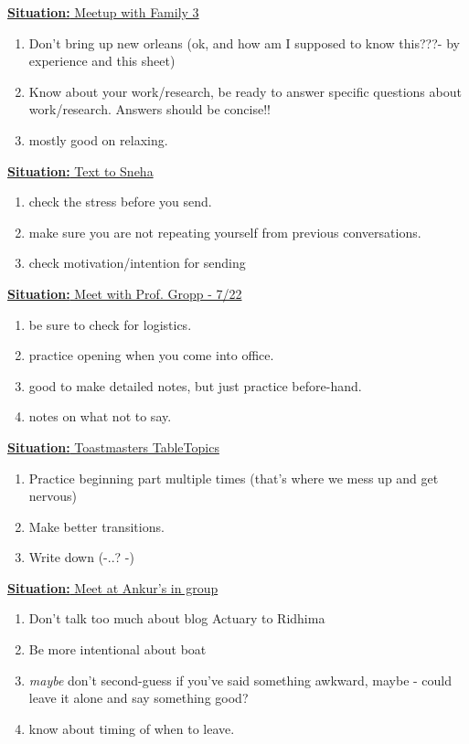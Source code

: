 \documentclass[11pt]{article}
\newcommand{\newSituation}[1]{\underline{\textbf{Situation:} #1} }
\begin{document}
\newSituation{Meetup with Family 3}
\begin{enumerate}
\item Don't bring up new orleans (ok, and how am I supposed to know this???- by experience and this sheet) 
\item Know about your work/research, be ready to answer specific questions about work/research. Answers should be concise!!
\item mostly good on relaxing. 
\end{enumerate} 

\newSituation{Text to Sneha}
\begin{enumerate} 
\item check the stress before you send. 
\item make sure you are not repeating yourself from previous conversations. 
\item check motivation/intention for sending
\end{enumerate} 

\newSituation{Meet with Prof. Gropp - 7/22}
\begin{enumerate}
\item be sure to check for logistics. 
\item practice opening when you come into office. 
\item good to make detailed notes, but just practice before-hand. 
\item notes on what not to say. 

\end{enumerate} 

\newSituation{Toastmasters TableTopics} 
\begin{enumerate} 
\item Practice beginning part multiple times (that's where we mess up and get nervous)
\item Make better transitions. 
\item Write down (-..? -)
\end{enumerate}

\newSituation{Meet at Ankur's in group}
\begin{enumerate} 
\item Don't talk too much about blog Actuary to Ridhima 
\item Be more intentional about boat 
\item \textit{maybe} don't second-guess if you've said something awkward, maybe  - could leave it alone and say something good?
\item know about timing of when to leave.
\end{enumerate}
\end{document}
